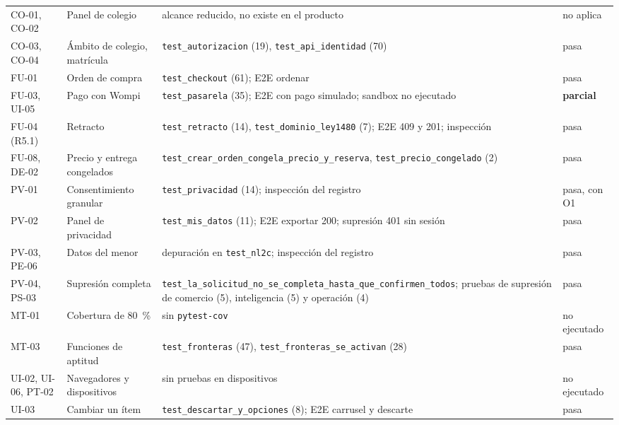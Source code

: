 \documentclass[11pt,letterpaper]{article}
\newcommand{\ruta}[1]{\texttt{\small #1}}
\begin{document}
\begin{longtable}{L{2.2cm}L{3.6cm}L{6.3cm}L{2.6cm}}
CO-01, CO-02 & Panel de colegio & alcance reducido, no existe en el producto & no aplica \\
CO-03, CO-04 & Ámbito de colegio, matrícula & \ruta{test\_\allowbreak{}autorizacion} (19), \ruta{test\_\allowbreak{}api\_\allowbreak{}identidad} (70) & pasa \\
FU-01 & Orden de compra & \ruta{test\_\allowbreak{}checkout} (61); E2E ordenar & pasa \\
FU-03, UI-05 & Pago con Wompi & \ruta{test\_\allowbreak{}pasarela} (35); E2E con pago simulado; sandbox no ejecutado &
\textbf{parcial} \\
FU-04 (R5.1) & Retracto & \ruta{test\_\allowbreak{}retracto} (14), \ruta{test\_\allowbreak{}dominio\_\allowbreak{}ley1480} (7); E2E 409 y 201;
inspección & pasa \\
FU-08, DE-02 & Precio y entrega congelados & \ruta{test\_\allowbreak{}crear\_\allowbreak{}orden\_\allowbreak{}congela\_\allowbreak{}precio\_\allowbreak{}y\_\allowbreak{}reserva},
\ruta{test\_\allowbreak{}precio\_\allowbreak{}congelado} (2) & pasa \\
PV-01 & Consentimiento granular & \ruta{test\_\allowbreak{}privacidad} (14); inspección del registro & pasa, con O1 \\
PV-02 & Panel de privacidad & \ruta{test\_\allowbreak{}mis\_\allowbreak{}datos} (11); E2E exportar 200; supresión 401 sin sesión & pasa \\
PV-03, PE-06 & Datos del menor & depuración en \ruta{test\_\allowbreak{}nl2c}; inspección del registro & pasa \\
PV-04, PS-03 & Supresión completa & \ruta{test\_\allowbreak{}la\_\allowbreak{}solicitud\_\allowbreak{}no\_\allowbreak{}se\_\allowbreak{}completa\_\allowbreak{}hasta\_\allowbreak{}que\_\allowbreak{}confirmen\_\allowbreak{}todos};
pruebas de supresión de comercio (5), inteligencia (5) y operación (4) & pasa \\
MT-01 & Cobertura de 80~\% & sin \ruta{pytest-cov} & no ejecutado \\
MT-03 & Funciones de aptitud & \ruta{test\_\allowbreak{}fronteras} (47), \ruta{test\_\allowbreak{}fronteras\_\allowbreak{}se\_\allowbreak{}activan} (28) & pasa \\
UI-02, UI-06, PT-02 & Navegadores y dispositivos & sin pruebas en dispositivos & no ejecutado \\
UI-03 & Cambiar un ítem & \ruta{test\_\allowbreak{}descartar\_\allowbreak{}y\_\allowbreak{}opciones} (8); E2E carrusel y descarte & pasa \\

\end{longtable}
\end{document}
